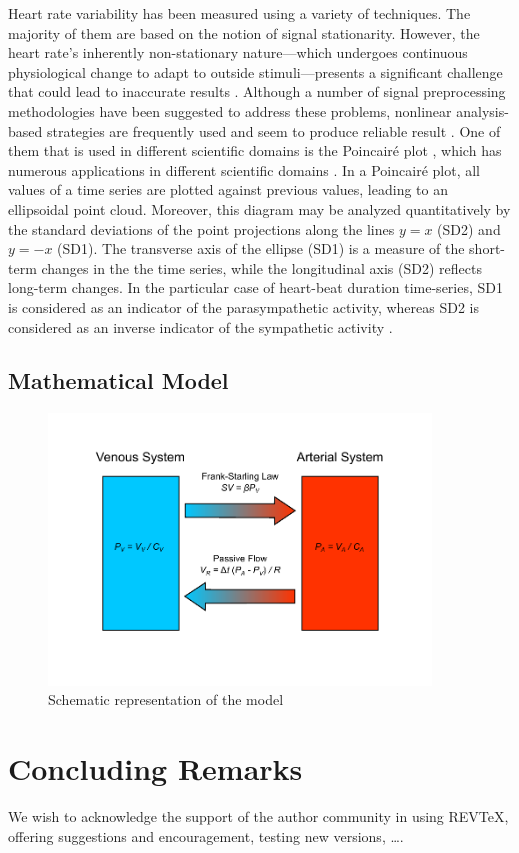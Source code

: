 \documentclass[%
preprint,
 amsmath,amssymb,
 aps,
]{revtex4-2}
\begin{document}
Heart rate variability has been measured using a variety of techniques. The majority of them are based on the notion of signal stationarity. However, the heart rate's inherently non-stationary nature---which undergoes continuous physiological change to adapt to outside stimuli---presents a significant challenge that could lead to inaccurate results \citep{Marwan_2007}. Although a number of signal preprocessing methodologies have been suggested to address these problems, nonlinear analysis-based strategies are frequently used and seem to produce reliable result \citep{Marwan_2002, Aubert_2003, Marwan_2007, Giuliani_1998, Rajendra_Acharya_2006, Webber_1994, Henriques_2020}. One of them that is used in different scientific domains is the Poincairé plot \citep{Hoshi_2016, Webber_1994}, which has numerous applications in different scientific domains \citep{Voss_2008}. In a Poincairé plot, all values of a time series are plotted against previous values, leading to an ellipsoidal point cloud. Moreover, this diagram may be analyzed quantitatively by the standard deviations of the point projections along the lines $y = x$ (SD2) and $y = -x$ (SD1). The transverse axis of the ellipse (SD1) is a measure of the short-term changes in the the time series, while the longitudinal axis (SD2) reflects long-term changes. In the particular case of heart-beat duration time-series, SD1 is considered as an indicator of the parasympathetic activity, whereas SD2 is considered as an inverse indicator of the sympathetic activity \citep{Zimatore_2022}.

\subsection{Mathematical Model}

\begin{figure}
\includegraphics[width=4in]{model.pdf}
\caption{Schematic representation of the model}
\label{fig:model}
\end{figure}

\section{Concluding Remarks}

\begin{acknowledgments}
We wish to acknowledge the support of the author community in using
REV\TeX{}, offering suggestions and encouragement, testing new versions,
\dots.
\end{acknowledgments}



\end{document}
